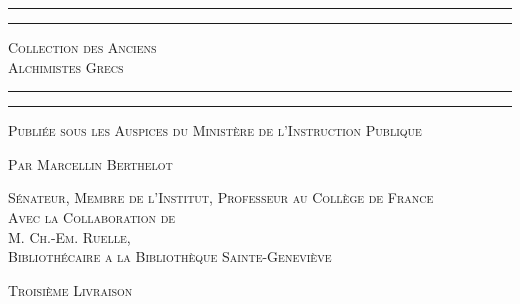 \documentclass[a4paper, 11pt, oneside, polutonikogreek, french]{article}
\begin{document}
\begin{titlepage} %
	\centering %

	
	\rule{\textwidth}{1.6pt}\vspace*{-\baselineskip}\vspace*{2pt} %
	\rule{\textwidth}{0.4pt} %
	
	\vspace{1\baselineskip} %
	
	{\scshape\Huge Collection des Anciens \\ Alchimistes Grecs}
	
	\vspace{1\baselineskip} %

	\rule{\textwidth}{0.4pt}\vspace*{-\baselineskip}\vspace{3.2pt} %
	\rule{\textwidth}{1.6pt} %
	
	\vspace{1\baselineskip} %
	
	
	{\scshape \normalsize Publiée sous les Auspices du Ministère de l'Instruction Publique}
	
	{\scshape Par \Large Marcellin Berthelot} %
	
	\vspace*{1\baselineskip} %
	
        {\scshape\scriptsize Sénateur, Membre de l'Institut, Professeur au Collège de France \\Avec la Collaboration de \\\large M. Ch.-Em. Ruelle,\\\scriptsize Bibliothécaire a la Bibliothèque Sainte-Geneviève} %
  
        \vspace{4\baselineskip}
  
	{\scshape \normalsize Troisième Livraison} %
  


\end{titlepage}
\end{document}
